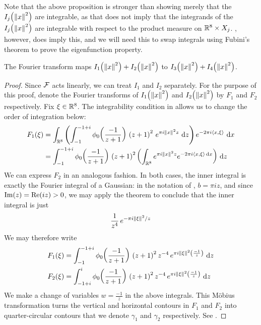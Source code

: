 Note that the above proposition is stronger than showing merely that the $I_j\!\left( \left\lVert x \right\rVert^2 \right)$ are integrable, as that does not imply that the integrands of the $I_j\!\left( \left\lVert x \right\rVert^2 \right)$ are integrable with respect to the product measure on $\mathbb{R}^8 \times X_j$. , however, does imply this, and we will need this to swap integrals using Fubini's theorem to prove the eigenfunction property.

\begin{boxlemma}\label{Ch4:Lemma:Fourier_I_1_add_I_2_eq_I_3_add_I_4}
    The Fourier transform %
    maps $I_1\!\left( \left\lVert x \right\rVert^2 \right) + I_2\!\left( \left\lVert x \right\rVert^2 \right)$ to $I_3\!\left( \left\lVert x \right\rVert^2 \right) + I_4\!\left( \left\lVert x \right\rVert^2 \right)$.
\end{boxlemma}
\begin{proof}
    Since $\mathcal{F}$ acts linearly, we can treat $I_1$ and $I_2$ separately. For the purpose of this proof, denote the Fourier transforms of $I_1\!\left( \left\lVert x \right\rVert^2 \right)$ and $I_2\!\left( \left\lVert x \right\rVert^2 \right)$ by $F_1$ and $F_2$ respectively. Fix $\xi \in \mathbb{R}^8$. The integrability condition in  allows us to change the order of integration below:
    \begin{align*}
        F_1\!\left( \xi \right) &= \int_{\mathbb{R}^8} \left( \int_{-1}^{-1 + i} \phi_0\!\left( \frac{-1}{z+1} \right) \, \left( z + 1 \right)^2 \, e^{\pi i \left\lVert x \right\rVert^2 z} \, \operatorname{d}\!{z} \right) e^{-2\pi i \left\langle x, \xi \right\rangle} \, \operatorname{d}\!{x} \\
        &= \int_{-1}^{-1 + i} \phi_0\!\left( \frac{-1}{z+1} \right) \, \left( z + 1 \right)^2 \left( \int_{\mathbb{R}^8} e^{\pi i \left\lVert x \right\rVert^2 z} e^{-2\pi i \left\langle x, \xi \right\rangle \operatorname{d}\!{x}} \right) \, \operatorname{d}\!{z}
    \end{align*}
    We can express $F_2$ in an analogous fashion. In both cases, the inner integral is exactly the Fourier integral of a Gaussian: in the notation of , $b = \pi i z$, and since $\operatorname{Im}(z) = \operatorname{Re}\!\left( i z \right) > 0$, we may apply the theorem to conclude that the inner integral is just
    \begin{align*}
        \frac{1}{z^4} \, e^{-\pi i \left\lVert \xi \right\rVert^2 / z}
    \end{align*}
    We may therefore write
    \begin{align*}
        F_1\!\left( \xi \right) &= \int_{-1}^{-1 + i} \phi_0\!\left( \frac{-1}{z+1} \right) \, \left( z + 1 \right)^2z^{-4} \, e^{\pi i \left\lVert \xi \right\rVert^2 \left( \frac{-1}{z} \right)} \, \operatorname{d}\!{z} \\
        F_2\!\left( \xi \right) &= \int_{-1 + i}^{i} \phi_0\!\left( \frac{-1}{z+1} \right) \, \left( z + 1 \right)^2z^{-4} \, e^{\pi i \left\lVert \xi \right\rVert^2 \left( \frac{-1}{z} \right)} \, \operatorname{d}\!{z}
    \end{align*}
    We make a change of variables $w = \frac{-1}{z}$ in the above integrals. This Möbius transformation turns the vertical and horizontal contours in $F_1$ and $F_2$ into quarter-circular contours that we denote $\gamma_1$ and $\gamma_2$ respectively. See .


\end{proof}
